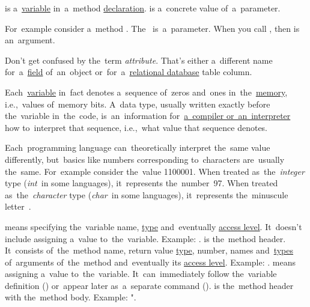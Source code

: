 \label{parameterargument}
\begin{itemize}
     is a~\hyperref[variablefieldproperty]{variable} in~a~method \hyperref[declarationdefinition]{declaration}.
     is a~concrete value of~a~parameter.
\end{itemize}
For~example consider a~method .
The~ is~a~parameter.
When you call , then  is an~argument.

\warning Don't get confused by the~term \textit{attribute}.
That's either a~different name for~a~\hyperref[variablefieldproperty]{field} of~an~object or~for~a~\hyperref[relationaldatabase]{relational database} table column.

\label{datatypes}
Each~\hyperref[variablefieldproperty]{variable} in~fact denotes a~sequence of~zeros and~ones in~the~\hyperref[systemmemory]{memory}, i.e.,~values of~memory bits.
A~data type, usually written exactly before the~variable in~the~code, is~an~information for~\hyperref[compiledinterpretedlanguages]{a~compiler or~an~interpreter} how to~interpret that sequence, i.e.,~what value that sequence denotes.

Each~programming language can~theoretically interpret the~same value differently, but~basics like numbers corresponding to~characters are~usually the~same.
For~example consider the~value 1100001.
When treated as~the~\textit{integer} type (\textit{int}~in some languages), it~represents the~number~97.
When treated as~the~\textit{character} type (\textit{char}~in some languages), it~represents the~minuscule letter~.
\newpage

\label{declarationdefinition}
\begin{itemize}
     means specifying the~variable name, \hyperref[datatypes]{type} and~eventually \hyperref[javaaccessmodifiers]{access level}.
            It~doesn't include assigning a~value to~the~variable.
            Example: .
     is the~method header.
            It~consists of~the~method name, return value \hyperref[datatypes]{type}, number, names and~\hyperref[datatypes]{types} of~arguments of~the~method and~eventually its \hyperref[javaaccessmodifiers]{access level}.
            Example: .
     means assigning a~value to~the~variable.
            It~can~immediately follow the~variable definition () or~appear later as~a~separate command ().
     is the~method header with the~method body.
            Example: ".
\end{itemize}

